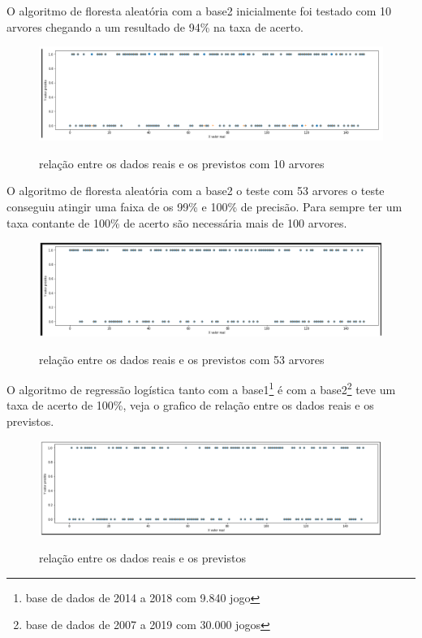 O algoritmo de floresta aleatória com a base2 inicialmente foi testado com 10 arvores chegando a um resultado de 94\% na taxa de acerto.
\begin{figure}[htbp]
	\begin{center}
		\includegraphics[width=0.7\linewidth]{imagens/florestaaleatoria.png}\\
	\end{center}
	\caption[relação entre os dados reais e os previstos com 10 arvores]{relação entre os dados reais e os previstos com 10 arvores}
	\label{fig:logo}
\end{figure}

O algoritmo de floresta aleatória com a base2 o teste com 53 arvores o teste conseguiu atingir uma faixa de os 99\% e 100\% de precisão. Para sempre ter um taxa contante de 100\% de acerto são necessária mais de 100 arvores.
\begin{figure}[htbp]
	\begin{center}
		\includegraphics[width=0.7\linewidth]{imagens/florestaaleatoriaAPI.png}\\
	\end{center}
	\caption[relação entre os dados reais e os previstos com 53 arvores]{relação entre os dados reais e os previstos com 53 arvores}
	\label{fig:logo}
\end{figure}
\newpage
O algoritmo de regressão logística tanto com a base1\footnote[4]{base de dados de 2014 a 2018 com 9.840 jogo} é com a  base2\footnote[5]{base de dados de 2007 a 2019 com 30.000 jogos} teve um taxa de acerto de 100\%, veja o grafico de relação entre os dados reais e os previstos.
\begin{figure}[htbp]
	\begin{center}
		\includegraphics[width=0.7\linewidth]{imagens/regressaologistocaAPI.png}\\
	\end{center}
	\caption[relação entre os dados reais e os previstos]{relação entre os dados reais e os previstos}
	\label{fig:logo}
\end{figure}

